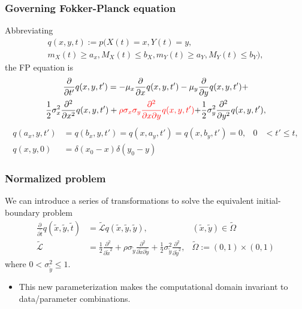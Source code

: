 \documentclass{beamer}
\begin{document}
\begin{frame}
  \frametitle{Governing Fokker-Planck equation}
  Abbreviating 
  \begin{multline*}
    q(x,y,t) := p(X(t) = x, Y(t) = y, \\
    m_X(t) \geq a_x, M_X(t) \leq b_X, m_Y(t) \geq
    a_Y, M_Y(t) \leq b_Y),
  \end{multline*}
  the FP equation is
  \begin{multline*}
    \displaystyle \frac{\partial}{\partial t'} q(x,y,t') = -\mu_x \frac{\partial}{\partial x}q(x,y,t')
    - \mu_y \frac{\partial}{\partial y}q(x,y,t') + \\
    \frac{1}{2}\sigma_x^2 \frac{\partial^2}{\partial x^2}q(x,y,t') + \color{red}{\rho\sigma_x\sigma_y \frac{\partial^2}{\partial x \partial y}  q(x,y,t')}
    \color{black}{ + \frac{1}{2}\sigma_y^2 \frac{\partial^2}{\partial y^2}q(x,y,t')},
  \end{multline*}
  \begin{align*}
    q(a_x, y,t') &= q(b_x,y,t') = q(x,a_y,t') = q(x,b_y,t') = 0, & 0 &< t' \leq t, \\
    q(x,y,0) &= \delta(x_0 - x)\delta(y_0 - y)
  \end{align*}

\end{frame}
\begin{frame}
  \frametitle{Normalized problem}
  We can introduce a series of transformations to solve the equivalent initial-boundary problem
  \begin{align*}
    \frac{\partial}{\partial \tilde{t}} q(\tilde{x},\tilde{y},\tilde{t}) &= \tilde{\mathcal{L}} q(\tilde{x},\tilde{y},\tilde{y}), & (\tilde{x}, \tilde{y}) \in \tilde{\Omega} \\
    \tilde{\mathcal{L}} &= \frac{1}{2} \frac{\partial^2}{\partial \tilde{x}^2} + \rho \sigma_{\tilde{y}} \frac{\partial^2}{\partial \tilde{x} \partial \tilde{y}} + \frac{1}{2} \sigma^2_{\tilde{y}} \frac{\partial^2}{\partial \tilde{y}^2},& \tilde{\Omega} := (0,1) \times (0,1)
  \end{align*}
  where $0 < \sigma_{\tilde{y}}^2 \leq 1$.

  \begin{itemize}
  \item This new parameterization makes the computational domain invariant
  to data/parameter combinations.
  \end{itemize}
\end{frame}
\end{document}
